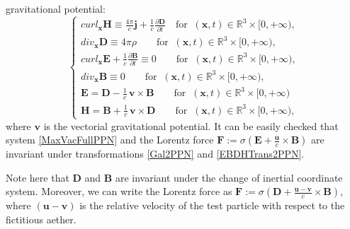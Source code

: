 \documentclass{article}
\theoremstyle{definition}
\theoremstyle{remark}
\renewcommand{\vec}[1]{\mathbf{#1}}
\newcommand{\R}{\mathbb{R}}
\newcommand{\er}{\eqref}
\newcommand{\R}{{\mathbb{R}}}
\newcommand{\er}{\eqref}
\begin{document}
gravitational potential:
\begin{equation}\label{MaxVacFullPPN}
\begin{cases}
curl_{\vec x} \vec H\equiv \frac{4\pi}{c}\vec j+\frac{1}{c}\frac{\partial \vec D}{\partial t}\quad\text{for}\;\;(\vec x,t)\in\R^3\times[0,+\infty),\\
div_{\vec x} \vec D\equiv 4\pi\rho\quad\quad\text{for}\;\;(\vec x,t)\in\R^3\times[0,+\infty),\\
curl_{\vec x} \vec E+\frac{1}{c}\frac{\partial \vec B}{\partial t}\equiv 0\quad\quad\text{for}\;\;(\vec x,t)\in\R^3\times[0,+\infty),\\
div_{\vec x} \vec B\equiv
0\quad\quad\text{for}\;\;(\vec x,t)\in\R^3\times[0,+\infty),\\
\vec E=\vec D-\frac{1}{c}\,\vec v\times
\vec B\quad\quad\text{for}\;\;(\vec x,t)\in\R^3\times[0,+\infty)\\
\vec H=\vec B+\frac{1}{c}\,\vec v\times \vec
D\quad\quad\text{for}\;\;(\vec x,t)\in\R^3\times[0,+\infty),
\end{cases}
\end{equation}
where $\vec v$ is the vectorial gravitational potential. It can be
easily checked that system \er{MaxVacFullPPN} and the Lorentz force
$\vec F:=\sigma(\vec E+\frac{\vec u}{c}\times \vec B)$ are invariant
under transformations \er{Gal2PPN} and \er{EBDHTrans2PPN}.
%
%
%
%
\begin{comment}
\begin{equation}\label{Gal2}
\begin{cases}
\vec x'=\vec x+t\vec w,\\
t'=t.
\end{cases}
\end{equation}
and
\begin{equation}\label{EBDHTrans2}
\begin{cases}
\vec D'=\vec D,\\
\vec B'=\vec B,\\
\vec E'=\vec E-\frac{1}{c}\,\vec w\times \vec B,\\
\vec H'=\vec H+\frac{1}{c}\,\vec w\times \vec D.
\end{cases}
\end{equation}
\end{comment}
%
%
%
%
Note here that $\vec D$ and $\vec B$ are invariant under the change
of inertial coordinate system. Moreover, we can write the Lorentz
force as $\vec F:=\sigma(\vec D+\frac{\vec u-\vec v}{c}\times \vec
B)$, where $(\vec u-\vec v)$ is the relative velocity of the test
particle with respect to the fictitious aether.
\end{document}
